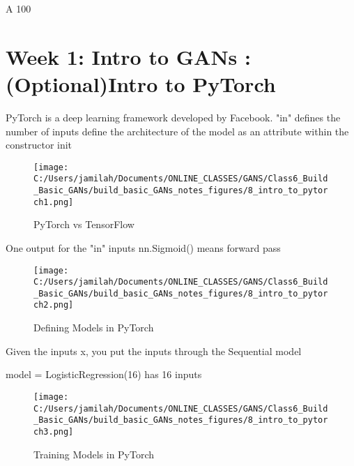 \documentclass[11pt, onecolumn]{article}
\begin{document}
A 100%


\clearpage
\section{Week 1: Intro to GANs : (Optional)Intro to PyTorch}

PyTorch is a deep learning framework developed by Facebook.
"in" defines the number of inputs
define the architecture of the model as an attribute within the constructor init

\begin{figure}[htp]
\begin{center}
\texttt{[image: C:/Users/jamilah/Documents/ONLINE\_CLASSES/GANS/Class6\_Build\_Basic\_GANs/build\_basic\_GANs\_notes\_figures/8\_intro\_to\_pytorch1.png]}
\end{center}
\caption{PyTorch vs TensorFlow}
\label{8_intro_to_pytorch1}
\end{figure}

One output for the "in" inputs 
nn.Sigmoid() means forward pass 

\begin{figure}[htp]
\begin{center}
\texttt{[image: C:/Users/jamilah/Documents/ONLINE\_CLASSES/GANS/Class6\_Build\_Basic\_GANs/build\_basic\_GANs\_notes\_figures/8\_intro\_to\_pytorch2.png]}
\end{center}
\caption{Defining Models in PyTorch}
\label{8_intro_to_pytorch2}
\end{figure}

Given the inputs x, you put the inputs through the Sequential model

model = LogisticRegression(16) has 16 inputs
\begin{figure}[htp]
\begin{center}
\texttt{[image: C:/Users/jamilah/Documents/ONLINE\_CLASSES/GANS/Class6\_Build\_Basic\_GANs/build\_basic\_GANs\_notes\_figures/8\_intro\_to\_pytorch3.png]}
\end{center}
\caption{Training Models in PyTorch}
\label{8_intro_to_pytorch3}
\end{figure}
\end{document}
